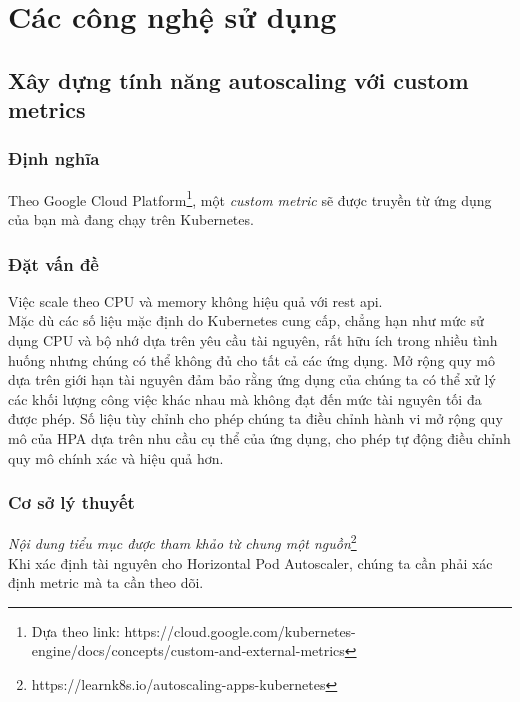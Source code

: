 \chapter{Các công nghệ sử dụng}
\section{Xây dựng tính năng autoscaling với custom metrics}

\subsection{Định nghĩa}
\noindent Theo Google Cloud Platform\footnote{Dựa theo link: https://cloud.google.com/kubernetes-engine/docs/concepts/custom-and-external-metrics}, một \textit{custom metric} sẽ được truyền từ ứng dụng của bạn mà đang chạy trên Kubernetes.
\subsection{Đặt vấn đề}
\noindent Việc scale theo CPU và memory không hiệu quả với rest api.\\
\noindent Mặc dù các số liệu mặc định do Kubernetes cung cấp, chẳng hạn như mức sử dụng CPU và bộ nhớ dựa trên yêu cầu tài nguyên, rất hữu ích trong nhiều tình huống nhưng chúng có thể không đủ cho tất cả các ứng dụng. Mở rộng quy mô dựa trên giới hạn tài nguyên đảm bảo rằng ứng dụng của chúng ta có thể xử lý các khối lượng công việc khác nhau mà không đạt đến mức tài nguyên tối đa được phép. Số liệu tùy chỉnh cho phép chúng ta điều chỉnh hành vi mở rộng quy mô của HPA dựa trên nhu cầu cụ thể của ứng dụng, cho phép tự động điều chỉnh quy mô chính xác và hiệu quả hơn.
\subsection{Cơ sở lý thuyết}
\textit{Nội dung tiểu mục được tham khảo từ chung một nguồn}\footnote{https://learnk8s.io/autoscaling-apps-kubernetes}\\[0.5cm]
Khi xác định tài nguyên cho Horizontal Pod Autoscaler, chúng ta cần phải xác định metric mà ta cần theo dõi.


